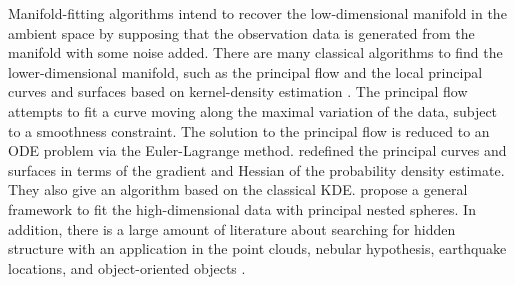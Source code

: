 \documentclass[aos,preprint]{imsart}
\theoremstyle{remark}
\begin{document}
Manifold-fitting algorithms intend to recover the low-dimensional manifold in the ambient space by supposing that the observation data is generated from the manifold with some noise added. There are many classical algorithms to find the lower-dimensional manifold, such as the principal flow \cite{panaretos2014principal} and the local principal curves and surfaces based on kernel-density estimation \cite{ozertem2011locally}. The principal flow attempts to fit a curve moving along the maximal variation of the data, subject to a smoothness constraint. The solution to the principal flow is reduced to an ODE problem via the Euler-Lagrange method.  \cite{ozertem2011locally} redefined the principal curves and surfaces in terms of the gradient and Hessian of the probability density estimate. They also give an algorithm based on the classical KDE. \cite{jung2012analysis} propose a general framework to fit the high-dimensional data with principal nested spheres. In addition, there is a large amount of literature about searching for hidden structure with an application in the point clouds, nebular hypothesis, earthquake locations, and object-oriented objects \cite{adams2011morse,davenport2010joint,klemela2009smoothing,book}.


\end{document}
